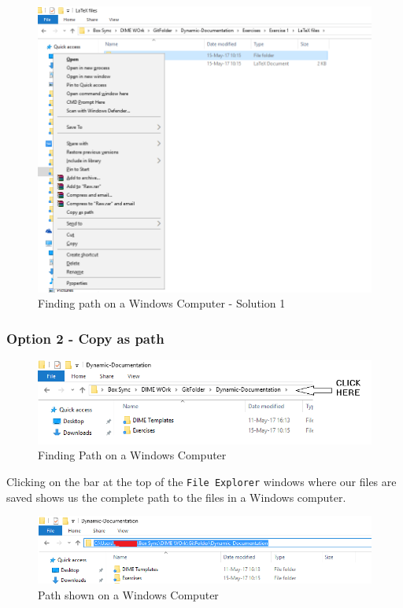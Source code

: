 \documentclass[]{article}
\begin{document}
\begin{figure}[h!]
	\centering
	\includegraphics[width=0.7\linewidth]{img/pathwin3}
	\caption{Finding path on a Windows Computer - Solution 1}
	\label{fig:pathwin3}
\end{figure}

\subsubsection*{Option 2 - Copy as path}

\begin{figure}[H]
	\centering
	\includegraphics[width=1\linewidth]{img/pathwin}
	\caption{Finding Path on a Windows Computer}
	\label{fig:pathwin}
\end{figure}

Clicking on the bar at the top of the \texttt{File Explorer} windows where our files are saved shows us the complete path to the files in a Windows computer. \\

\begin{figure}[H]
	\centering
	\includegraphics[width=1\linewidth]{img/pathwin2}
	\caption{Path shown on a Windows Computer}
	\label{fig:pathwin2}
\end{figure}
\end{document}

